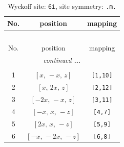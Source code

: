 \documentclass[fleqn,8pt]{jsarticle}
\begin{document}
\renewcommand{\arraystretch}{1.2}
\begin{longtable}{ccc}
\caption{Wyckoff site: {\tt 6i}, site symmetry: {\tt .m.}}
 \\
 \hline \hline
No. & position & mapping \\ \hline \endfirsthead

\multicolumn{2}{l}{\tablename\ \thetable{}} \\
 \hline \hline
No. & position & mapping \\ \hline \endhead

 \hline \hline
\multicolumn{2}{r}{\footnotesize\it continued ...} \\ \endfoot

 \hline \hline
\multicolumn{2}{r}{} \\ \endlastfoot

1 & $\left[ x,\, - x,\, z \right]$ & {\tt [1,10]} \\ \hline
2 & $\left[ x,\, 2 x,\, z \right]$ & {\tt [2,12]} \\ \hline
3 & $\left[ - 2 x,\, - x,\, z \right]$ & {\tt [3,11]} \\ \hline
4 & $\left[ - x,\, x,\, - z \right]$ & {\tt [4,7]} \\ \hline
5 & $\left[ 2 x,\, x,\, - z \right]$ & {\tt [5,9]} \\ \hline
6 & $\left[ - x,\, - 2 x,\, - z \right]$ & {\tt [6,8]} \\
\end{longtable}
\renewcommand{\arraystretch}{1.2}
\end{document}
